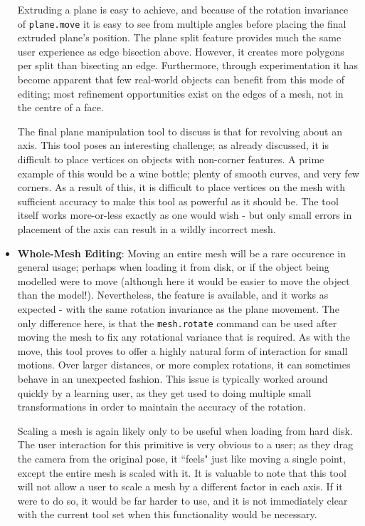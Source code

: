 \documentclass[a4paper,10pt]{article}
\begin{document}
\begin{itemize}
{Extruding a plane is easy to achieve, and because of the rotation invariance of \texttt{plane.move} it is easy to see from multiple angles before placing the final extruded plane's position. The plane split feature provides much the same user experience as edge bisection above. However, it creates more polygons per split than bisecting an edge. Furthermore, through experimentation it has become apparent that few real-world objects can benefit from this mode of editing; most refinement opportunities exist on the edges of a mesh, not in the centre of a face.

The final plane manipulation tool to discuss is that for revolving about an axis. This tool poses an interesting challenge; as already discussed, it is difficult to place vertices on objects with non-corner features. A prime example of this would be a wine bottle; plenty of smooth curves, and very few corners. As a result of this, it is difficult to place vertices on the mesh with sufficient accuracy to make this tool as powerful as it should be. The tool itself works more-or-less exactly as one would wish - but only small errors in placement of the axis can result in a wildly incorrect mesh. 

}

\item{\textbf{Whole-Mesh Editing}: Moving an entire mesh will be a rare occurence in general usage; perhaps when loading it from disk, or if the object being modelled were to move (although here it would be easier to move the object than the model!). Nevertheless, the feature is available, and it works as expected - with the same rotation invariance as the plane movement. The only difference here, is that the \texttt{mesh.rotate} command can be used after moving the mesh to fix any rotational variance that is required. As with the move, this tool proves to offer a highly natural form of interaction for small motions. Over larger distances, or more complex rotations, it can sometimes behave in an unexpected fashion. This issue is typically worked around quickly by a learning user, as they get used to doing multiple small transformations in order to maintain the accuracy of the rotation.

Scaling a mesh is again likely only to be useful when loading from hard disk. The user interaction for this primitive is very obvious to a user; as they drag the camera from the original pose, it ``feels" just like moving a single point, except the entire mesh is scaled with it. It is valuable to note that this tool will not allow a user to scale a mesh by a different factor in each axis. If it were to do so, it would be far harder to use, and it is not immediately clear with the current tool set when this functionality would be necessary.

}
\end{itemize}
\end{document}
